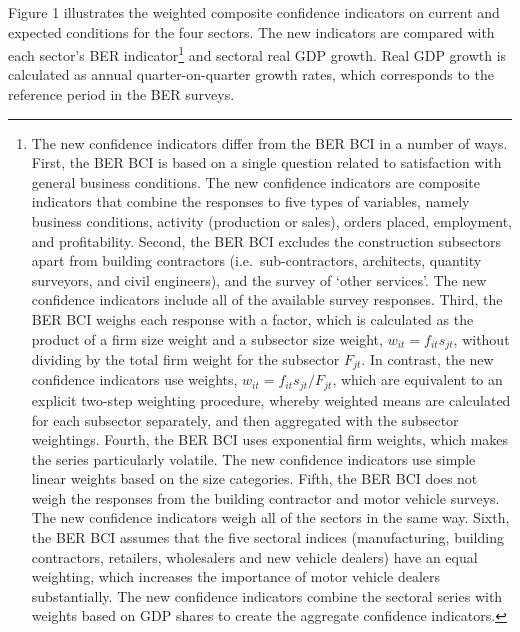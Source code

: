 \documentclass[11pt,]{article}
\let\rmarkdownfootnote\footnote%
\def\footnote{\protect\rmarkdownfootnote}
\begin{document}
Figure 1 illustrates the weighted composite confidence indicators on
current and expected conditions for the four sectors. The new indicators
are compared with each sector's BER indicator\footnote{The new
  confidence indicators differ from the BER BCI in a number of ways.
  First, the BER BCI is based on a single question related to
  satisfaction with general business conditions. The new confidence
  indicators are composite indicators that combine the responses to five
  types of variables, namely business conditions, activity (production
  or sales), orders placed, employment, and profitability. Second, the
  BER BCI excludes the construction subsectors apart from building
  contractors (i.e.~sub-contractors, architects, quantity surveyors, and
  civil engineers), and the survey of `other services'. The new
  confidence indicators include all of the available survey responses.
  Third, the BER BCI weighs each response with a factor, which is
  calculated as the product of a firm size weight and a subsector size
  weight, \(w_{it} = f_{it} s_{jt}\), without dividing by the total firm
  weight for the subsector \(F_{jt}\). In contrast, the new confidence
  indicators use weights, \(w_{it} = f_{it} s_{jt} / F_{jt}\), which are
  equivalent to an explicit two-step weighting procedure, whereby
  weighted means are calculated for each subsector separately, and then
  aggregated with the subsector weightings. Fourth, the BER BCI uses
  exponential firm weights, which makes the series particularly
  volatile. The new confidence indicators use simple linear weights
  based on the size categories. Fifth, the BER BCI does not weigh the
  responses from the building contractor and motor vehicle surveys. The
  new confidence indicators weigh all of the sectors in the same way.
  Sixth, the BER BCI assumes that the five sectoral indices
  (manufacturing, building contractors, retailers, wholesalers and new
  vehicle dealers) have an equal weighting, which increases the
  importance of motor vehicle dealers substantially. The new confidence
  indicators combine the sectoral series with weights based on GDP
  shares to create the aggregate confidence indicators.} and sectoral
real GDP growth. Real GDP growth is calculated as annual
quarter-on-quarter growth rates, which corresponds to the reference
period in the BER surveys.
\end{document}

